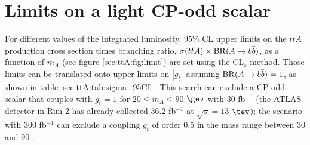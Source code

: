\section{Limits on a light CP-odd scalar}
For different values of the integrated luminosity, $95\%$ CL upper limits on the $t\bar{t}A$ production cross section times branching ratio, $\sigma(t\bar{t}A)\times {\rm BR}(A\to b\bar{b})$, as a function of $m_{A}$ (see figure \ref{sec:ttA:fig:limit}) are set using the CL$_{s}$ method. Those limits can be translated onto upper limits on $|g_{t}|$ assuming ${\rm BR}(A\to b\bar{b})=1$, as shown in table \ref{sec:ttA:tab:sigma_95CL}. 
This search can exclude a  CP-odd scalar that couples with $g_{t}=1$ for $20\le m_{A} \le90$ $\gev$ with 30 fb$^{-1}$ (the ATLAS detector in Run 2 has already collected 36.2 fb$^{-1}$ at $\sqrt{s}=13$ $\tev$); the scenario with 300 fb$^{-1}$ can exclude a coupling $g_{t}$ of order 0.5 in the mass range between 30 and 90 \gev. 


